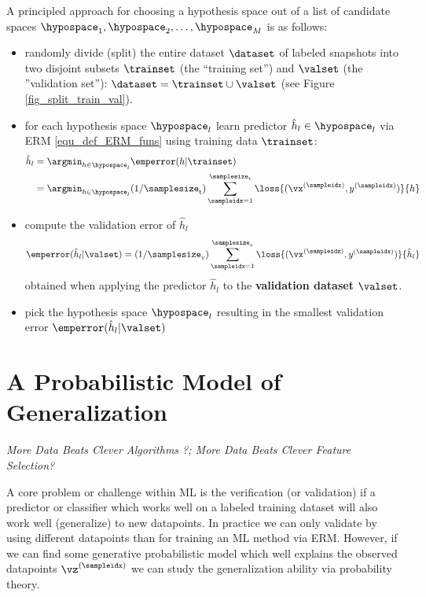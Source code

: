 \documentclass[12pt]{report}
\begin{document}
A principled approach for choosing a hypothesis space out of a  
list of candidate spaces $\hypospace_{1},\hypospace_{2},\ldots,\hypospace_{M}$ 
is as follows: 
\begin{itemize} 
\item randomly divide (split) the entire dataset $\dataset$ of labeled snapshots into two disjoint subsets 
$\trainset$ (the ``training set'') and $\valset$ (the ''validation set''): 
$\dataset = \trainset \cup \valset$ (see Figure \ref{fig_split_train_val}). 
\item for each hypothesis space $\hypospace_{l}$ learn predictor $\hat{h}_{l} \in \hypospace_{l}$ via ERM \eqref{equ_def_ERM_funs} using training data $\trainset$:
\begin{align} 
\label{equ_def_hat_h_fitting_sel}
\hat{h}_{l} & = \argmin_{h \in \hypospace_{l}} \emperror(h| \trainset) \nonumber \\
& = \argmin_{h \in \hypospace_{l}}  (1/\samplesize_{\rm t}) \sum_{\sampleidx=1}^{\samplesize_{\rm t}} \loss{(\vx^{(\sampleidx)},y^{(\sampleidx)})}{h} %
\end{align} 
\item compute the validation error of $\hat{h}_{l}$ 
\begin{equation} 
\label{equ_def_training_val_val_modsel}
\emperror(\hat{h}_{l}|\valset) = (1/\samplesize_{\rm v}) \sum_{\sampleidx=1}^{\samplesize_{\rm v}} \loss{(\vx^{(\sampleidx)},y^{(\sampleidx)})} {\hat{h}_{l}}  %
\end{equation}  
obtained when applying the predictor $\hat{h}_{l}$ to the {\bf validation dataset} $\valset$. 
\item pick the hypothesis space $\hypospace_{l}$ resulting in the smallest validation error $\emperror(\hat{h}_{l}|\valset)$
\end{itemize} 



\section{A Probabilistic Model of Generalization} 
\label{sec_gen_linreg}
\emph{More Data Beats Clever Algorithms ?; More Data Beats Clever Feature Selection?}

A core problem or challenge within ML is the verification (or validation) if a 
predictor or classifier which works well on a labeled training dataset will also 
work well (generalize) to new datapoints. In practice we can only validate 
by using different datapoints than for training an ML method via ERM. However, 
if we can find some generative probabilistic model which well explains the 
observed datapoints $\vz^{(\sampleidx)}$ we can study the generalization 
ability via probability theory. 
\end{document}
